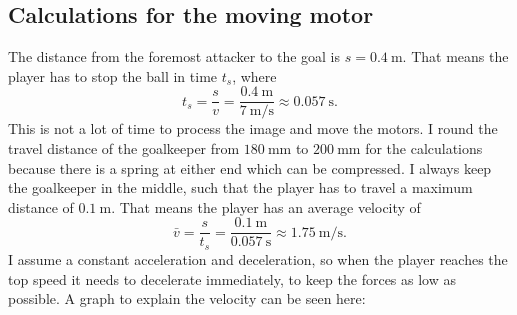 \subsection{Calculations for the moving motor}\label{subsec:moving_motor}
The distance from the foremost attacker to the goal is $s=\qty[per-mode=symbol]{0.4}{\m}$.
That means the player has to stop the ball in time $t_s$, where
\begin{equation}
    \label{eq:stopping_time}
    t_s = \frac{s}{v} = \frac{\qty[per-mode=symbol]{0.4}{\m}}{\qty[per-mode=symbol]{7}{\m\per\s}} \approx \qty[per-mode=symbol]{0.057}{\s}.
\end{equation}
This is not a lot of time to process the image and move the motors.
I round the travel distance of the goalkeeper from $\qty[per-mode=symbol]{180}{\mm}$ to $\qty[per-mode=symbol]{200}{\mm}$ for the calculations because there is a spring at either end which can be compressed.
I always keep the goalkeeper in the middle, such that the player has to travel a maximum distance of
$\qty[per-mode=symbol]{0.1}{\m}$.
\newpage
\noindent That means the player has an average velocity of
\begin{equation}
    \label{eq:average_velocity}
    \bar{v} = \frac{s}{t_s} = \frac{\qty[per-mode=symbol]{0.1}{\m}}{\qty[per-mode=symbol]{0.057}{\s}} \approx \qty[per-mode=symbol]{1.75}{\m\per\s}.
\end{equation}
I assume a constant acceleration and deceleration, so when the player reaches the top speed it needs to decelerate immediately, to keep the forces as low as possible.
A graph to explain the velocity can be seen here:

\begin{center}
\end{center}


